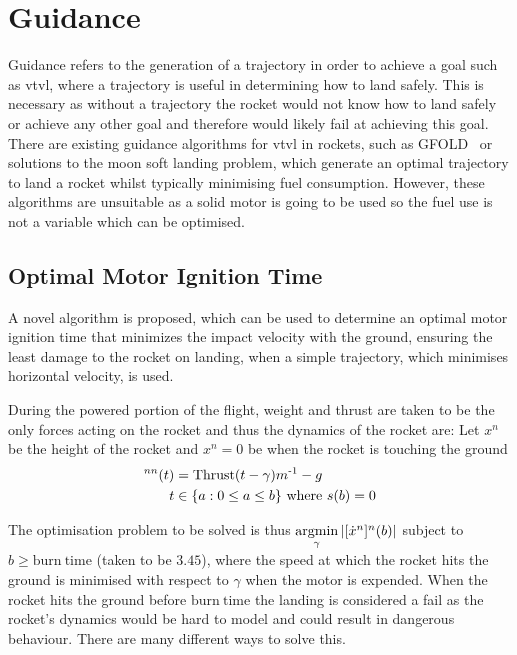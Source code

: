 \section{Guidance} 
\label{sec:Guidance}

Guidance refers to the generation of a trajectory in order to achieve a goal such as \gls{vtvl}, where a trajectory is useful in determining how to land safely.
This is necessary as without a trajectory the rocket would not know how to land safely or achieve any other goal and therefore would likely fail at achieving this goal.
There are existing guidance algorithms for \gls{vtvl} in rockets, such as GFOLD~\cite{Aci2007, Aci2013,Bla2010} or solutions to the moon soft landing problem, which generate an optimal trajectory to land a rocket whilst typically minimising fuel consumption.
However, these algorithms are unsuitable as a solid motor is going to be used so the fuel use is not a variable which can be optimised.
%
\subsection{Optimal Motor Ignition Time}

A novel algorithm is proposed, which can be used to determine an optimal motor ignition time that minimizes the impact velocity with the ground, ensuring the least damage to the rocket on landing, when a simple trajectory, which minimises horizontal velocity, is used.

During the powered portion of the flight, weight and thrust are taken to be the only forces acting on the rocket and thus the dynamics of the rocket are:
Let $x^n$ be the height of the rocket and $x^n = 0$ be when the rocket is touching the ground
\begin{align}
    [\ddot{x}^n]^{nn}(t) &= \mathrm{Thrust}(t - \gamma) m\inv -g \\
    t &\in \{a: 0 \leq a \leq b\} \text{ where } s(b) = 0
\end{align}

The optimisation problem to be solved is thus $\operatorname*{argmin}\limits_\gamma \abs{[\dot{x}^n]^n(b)}$ subject to $b \geq \mathrm{burn\ time}$ (taken to be $3.45$), where the speed at which the rocket hits the ground is minimised with respect to $\gamma$ when the motor is expended.
When the rocket hits the ground before $\mathrm{burn\ time}$ the landing is considered a fail as the rocket's dynamics would be hard to model and could result in dangerous behaviour.
There are many different ways to solve this.

